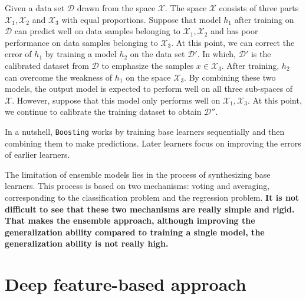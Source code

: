 Given a data set $\mathcal{D}$ drawn from the space $\mathcal{X}$. The space $\mathcal{X}$ consists of three parts $\mathcal{X}_1, \mathcal{X}_2$ and $\mathcal{X}_3$ with equal proportions. Suppose that model $h_1$ after training on $\mathcal{D}$ can predict well on data samples belonging to $\mathcal{X}_1, \mathcal{X}_2$ and has poor performance on data samples belonging to $\mathcal{X}_3$. At this point, we can correct the error of $h_1$ by training a model $h_2$ on the data set $\mathcal{D}'$. In which, $\mathcal{D}'$ is the calibrated dataset from $\mathcal{D}$ to emphasize the samples $x\in\mathcal{X}_3$. After training, $h_2$ can overcome the weakness of $h_1$ on the space $\mathcal{X}_3$. By combining these two models, the output model is expected to perform well on all three sub-spaces of $\mathcal{X}$. However, suppose that this model only performs well on $\mathcal{X}_1, \mathcal{X}_3$. At this point, we continue to calibrate the training dataset to obtain $\mathcal{D}''$.


In a nutshell, \verb|Boosting| works by training base learners sequentially and then combining them to make predictions. Later learners focus on improving the errors of earlier learners.


The limitation of ensemble models lies in the process of synthesizing base learners. This process is based on two mechanisms: voting and averaging, corresponding to the classification problem and the regression problem. \textbf{It is not difficult to see that these two mechanisms are really simple and rigid. That makes the ensemble approach, although improving the generalization ability compared to training a single model, the generalization ability is not really high.}

\section{Deep feature-based approach}

